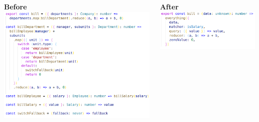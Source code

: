 \documentclass[14pt]{beamer}
\begin{document}
\begin{frame}
\begin{columns}
\begin{column}{.5\textwidth}
    \end{column}
  \end{columns}
\end{frame}

\begin{frame}
  \begin{columns}
    \begin{column}{.5\textwidth}
      \vspace{1em}
      \textbf{Before}
      \includegraphics[height=0.7\textheight,width=\textwidth,keepaspectratio]{graphics/bill-naive-ts.png}
    \end{column}
    \begin{column}{.5\textwidth}
      \vspace{1em}
      \textbf{After}
      \includegraphics[height=0.7\textheight,width=\textwidth,keepaspectratio]{graphics/bill-ts.png}
    \end{column}
  \end{columns}
\end{frame}
\end{document}

